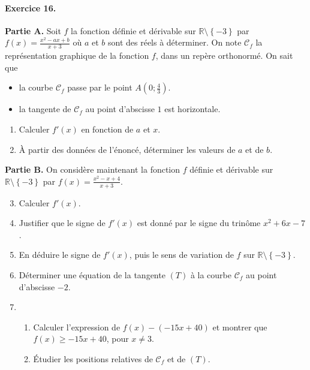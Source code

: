 \documentclass[11pt]{article}
\begin{document}
\paragraph{Exercice 16.} \textbf{Partie A.} Soit $f$ la fonction définie et dérivable sur
$\mathbb{R}\setminus\left\{ -3 \right\}$ par $f(x)=\frac{x^2-ax+b}{x+3}$ où $a$ et
$b$ sont des réels à déterminer. On note $\mathscr C_f$ la représentation
graphique de la fonction $f$, dans un repère orthonormé. On sait que
\begin{itemize}
  \item la courbe $\mathscr C_f$ passe par le point $A\left( 0;
    \frac{4}{3} \right)$.
  \item la tangente de $\mathscr C_f$ au point d'abscisse $1$ est horizontale.
\end{itemize}
\begin{enumerate}
  \item Calculer $f'(x)$ en fonction de $a$ et $x$.
  \item À partir des données de l'énoncé, déterminer les valeurs de $a$ et de
    $b$.
\end{enumerate}
\textbf{Partie B.} On considère maintenant la fonction $f$ définie et dérivable
sur $\mathbb{R}\setminus\left\{ -3 \right\}$ par $f(x)=\frac{x^2-x+4}{x+3}$.
\begin{enumerate}
    \setcounter{enumi}{2}
  \item Calculer $f'(x)$.
  \item Justifier que le signe de $f'(x)$ est donné par le signe du trinôme
    $x^2+6x-7$.
  \item En déduire le signe de $f'(x)$, puis le sens de variation de $f$ sur
    $\mathbb{R}\setminus\left\{ -3 \right\}$.
  \item Déterminer une équation de la tangente $(T)$ à la courbe $\mathscr C_f$
    au point d'abscisse $-2$.
  \item \begin{enumerate}
      \item Calculer l'expression de $f(x)-(-15x+40)$ et montrer que $f(x)\geq
        -15x+40$, pour $x\neq3$.
      \item Étudier les positions relatives de $\mathscr C_f$ et de $(T)$.
    \end{enumerate}
\end{enumerate}
\end{document}
